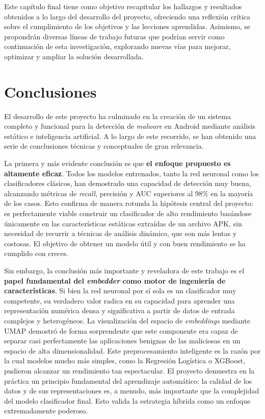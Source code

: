 
Este capítulo final tiene como objetivo recapitular los hallazgos y resultados obtenidos a lo largo del desarrollo del proyecto, ofreciendo una reflexión crítica sobre el cumplimiento de los objetivos y las lecciones aprendidas. Asimismo, se propondrán diversas líneas de trabajo futuras que podrían servir como continuación de esta investigación, explorando nuevas vías para mejorar, optimizar y ampliar la solución desarrollada.

\section{Conclusiones}

El desarrollo de este proyecto ha culminado en la creación de un sistema completo y funcional para la detección de \textit{malware} en Android mediante análisis estático e inteligencia artificial. A lo largo de este recorrido, se han obtenido una serie de conclusiones técnicas y conceptuales de gran relevancia.

La primera y más evidente conclusión es que \textbf{el enfoque propuesto es altamente eficaz}. Todos los modelos entrenados, tanto la red neuronal como los clasificadores clásicos, han demostrado una capacidad de detección muy buena, alcanzando métricas de \textit{recall}, precisión y AUC superiores al 98\% en la mayoría de los casos. Esto confirma de manera rotunda la hipótesis central del proyecto: es perfectamente viable construir un clasificador de alto rendimiento basándose únicamente en las características estáticas extraídas de un archivo APK, sin necesidad de recurrir a técnicas de análisis dinámico, que son más lentas y costosas. El objetivo de obtener un modelo útil y con buen rendimiento se ha cumplido con creces.

Sin embargo, la conclusión más importante y reveladora de este trabajo es el \textbf{papel fundamental del \textit{embedder} como motor de ingeniería de características}. Si bien la red neuronal por sí sola es un clasificador muy competente, su verdadero valor radica en su capacidad para aprender una representación numérica densa y significativa a partir de datos de entrada complejos y heterogéneos. La visualización del espacio de \textit{embeddings} mediante UMAP demostró de forma sorprendente que este componente era capaz de separar casi perfectamente las aplicaciones benignas de las maliciosas en un espacio de alta dimensionalidad. Este preprocesamiento inteligente es la razón por la cual modelos mucho más simples, como la Regresión Logística o XGBoost, pudieron alcanzar un rendimiento tan espectacular. El proyecto demuestra en la práctica un principio fundamental del aprendizaje automático: la calidad de los datos y de sus representaciones es, a menudo, más importante que la complejidad del modelo clasificador final. Esto valida la estrategia híbrida como un enfoque extremadamente poderoso.

